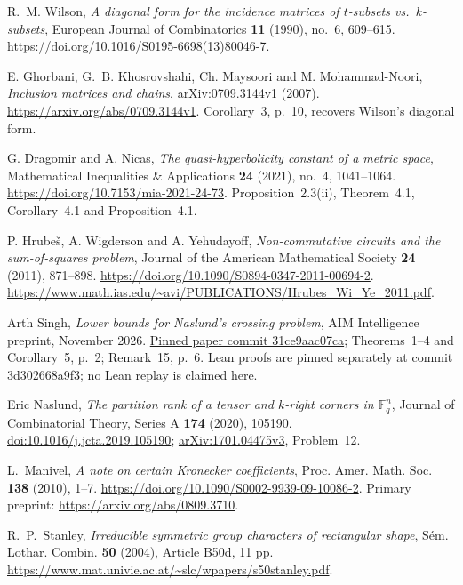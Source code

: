R.~M. Wilson, \emph{A diagonal form for the incidence matrices of
$t$-subsets vs.\ $k$-subsets},
European Journal of Combinatorics \textbf{11} (1990), no.~6, 609--615.
\url{https://doi.org/10.1016/S0195-6698(13)80046-7}.

E. Ghorbani, G.~B. Khosrovshahi, Ch. Maysoori and M. Mohammad-Noori,
\emph{Inclusion matrices and chains}, arXiv:0709.3144v1 (2007).
\url{https://arxiv.org/abs/0709.3144v1}.
Corollary~3, p.~10, recovers Wilson's diagonal form.

G. Dragomir and A. Nicas,
\emph{The quasi-hyperbolicity constant of a metric space},
Mathematical Inequalities \& Applications \textbf{24} (2021), no.~4,
1041--1064.
\url{https://doi.org/10.7153/mia-2021-24-73}.
Proposition~2.3(ii), Theorem~4.1, Corollary~4.1 and Proposition~4.1.

P. Hrube\v{s}, A. Wigderson and A. Yehudayoff,
\emph{Non-commutative circuits and the sum-of-squares problem},
Journal of the American Mathematical Society \textbf{24} (2011), 871--898.
\url{https://doi.org/10.1090/S0894-0347-2011-00694-2}.
\url{https://www.math.ias.edu/~avi/PUBLICATIONS/Hrubes_Wi_Ye_2011.pdf}.

 Arth Singh, \emph{Lower bounds for Naslund's crossing problem}, AIM Intelligence preprint, November 2026. \href{https://github.com/Arth-Singh/crossing-lower-bounds/blob/31ce9aac07ca04c2d12e50635339ebda1fc37417/paper/crossing-lower-bounds.pdf}{Pinned paper commit 31ce9aac07ca}; Theorems~1--4 and Corollary~5, p.~2; Remark~15, p.~6. Lean proofs are pinned separately at commit 3d302668a9f3; no Lean replay is claimed here.

 Eric Naslund, \emph{The partition rank of a tensor and $k$-right corners in $\mathbb F_q^n$}, Journal of Combinatorial Theory, Series A \textbf{174} (2020), 105190. \href{https://doi.org/10.1016/j.jcta.2019.105190}{doi:10.1016/j.jcta.2019.105190}; \href{https://arxiv.org/abs/1701.04475v3}{arXiv:1701.04475v3}, Problem~12.

L.~Manivel, \emph{A note on certain Kronecker coefficients},
Proc. Amer. Math. Soc. \textbf{138} (2010), 1--7.
\url{https://doi.org/10.1090/S0002-9939-09-10086-2}.
Primary preprint: \url{https://arxiv.org/abs/0809.3710}.

R.~P.~Stanley, \emph{Irreducible symmetric group characters of rectangular shape},
S\'em. Lothar. Combin. \textbf{50} (2004), Article B50d, 11 pp.
\url{https://www.mat.univie.ac.at/~slc/wpapers/s50stanley.pdf}.
